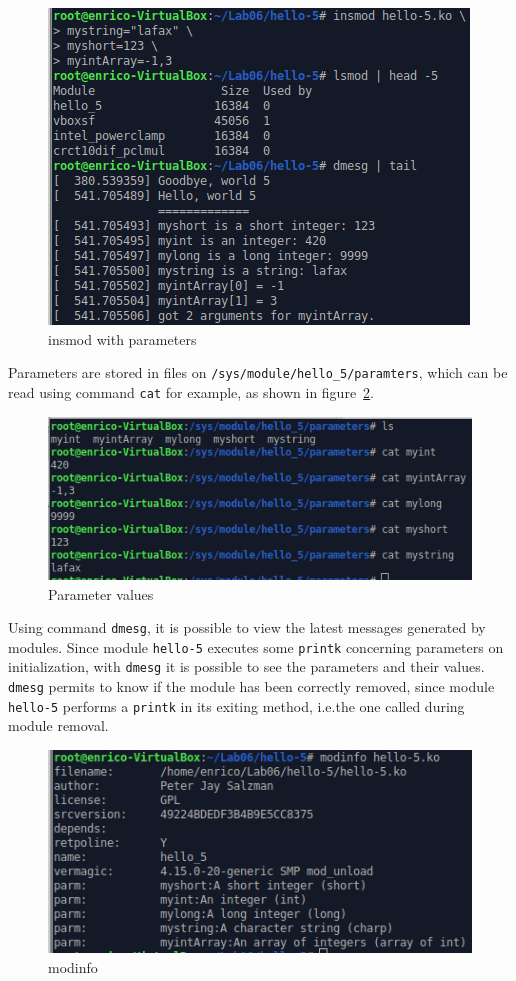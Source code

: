 \documentclass{report}
\begin{document}
\begin{figure}[hbtp]
\centering
\includegraphics[scale=0.45]{images/es01/insmod_parameters.png}
\caption{insmod with parameters}
\label{img:insmod_parameters}
\end{figure}

\newpage
Parameters are stored in files on \texttt{/sys/module/hello\_5/paramters}, which can be read using command \texttt{cat} for example, as shown in figure~\ref{img:cat_parameters}.

\begin{figure}[hbtp]
\centering
\includegraphics[scale=0.4]{images/es01/cat_parameters.png}
\caption{Parameter values}
\label{img:cat_parameters}
\end{figure}

Using command \texttt{dmesg}, it is possible to view the latest messages generated by modules. Since module \texttt{hello-5} executes some \texttt{printk} concerning parameters on initialization, with \texttt{dmesg} it is possible to see the parameters and their values. \texttt{dmesg} permits to know if the module has been correctly removed, since module \texttt{hello-5} performs a \texttt{printk} in its exiting method, i.e.\@ the one called during module removal.

\begin{figure}[hbtp]
\centering
\includegraphics[scale=0.4]{images/es01/modinfo.png}
\caption{modinfo}
\label{img:modinfo}
\end{figure}
\end{document}
